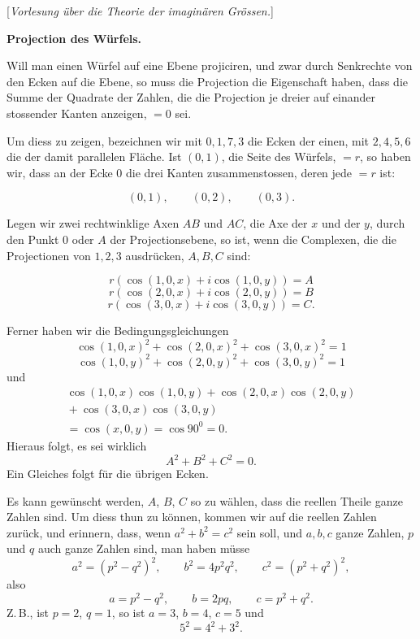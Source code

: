 \clearpage{}

\begin{center}[\emph{Vorlesung über die Theorie der imaginären Grössen.}]\end{center}

\begin{center}\bfseries Projection des Würfels.\end{center}

Will man einen Würfel auf eine Ebene projiciren, und zwar durch Senkrechte von den Ecken auf die Ebene, so muss die Projection die Eigenschaft haben, dass die Summe der Quadrate der Zahlen, die die Projection je dreier auf einander stossender Kanten anzeigen, $=0$ sei.

Um diess zu zeigen, bezeichnen wir mit $0,1,7,3$ die Ecken der einen, mit $2,4,5,6$ die der damit parallelen Fläche. Ist $(0,1)$, die Seite des Würfels, $=r$, so haben wir, dass an der Ecke $0$ die drei Kanten zusammenstossen, deren jede $=r$ ist:

\begin{center}\end{center}

\[
(0,1),\qquad (0,2),\qquad (0,3).
\]

Legen wir zwei rechtwinklige Axen $AB$ und $AC$, die Axe der $x$ und der $y$, durch den Punkt $0$ oder $A$ der Projectionsebene, so ist, wenn die Complexen, die die Projectionen von $1,2,3$ ausdrücken, $A,B,C$ sind:

\begin{center}\begin{minipage}{5.2cm}\end{minipage}\hspace{.3cm}\begin{minipage}{7.2cm}

\[
r(\cos(1,0,x)+i\cos(1,0,y)) = A
\]
\[
r(\cos(2,0,x)+i\cos(2,0,y)) = B
\]
\[
r(\cos(3,0,x)+i\cos(3,0,y)) = C.
\]
\end{minipage}\end{center}
Ferner haben wir die Bedingungsgleichungen
\[
\cos(1,0,x)^2+\cos(2,0,x)^2+\cos(3,0,x)^2 = 1
\]
\[
\cos(1,0,y)^2+\cos(2,0,y)^2+\cos(3,0,y)^2 = 1
\]
und
\[
\begin{gathered}\cos(1,0,x)\cos(1,0,y)+\cos(2,0,x)\cos(2,0,y)\\{}+\cos(3,0,x)\cos(3,0,y)\\{}=\cos(x,0,y)=\cos 90^0=0.\end{gathered}
\]
Hieraus folgt, es sei wirklich
\[
A^2+B^2+C^2=0.
\]
Ein Gleiches folgt für die übrigen Ecken.

Es kann gewünscht werden, $A$, $B$, $C$ so zu wählen, dass die reellen Theile ganze Zahlen sind. Um diess thun zu können, kommen wir auf die reellen Zahlen zurück, und erinnern, dass, wenn $a^2+b^2=c^2$ sein soll, und $a,b,c$ ganze Zahlen, $p$ und $q$ auch ganze Zahlen sind, man haben müsse
\[
a^2=(p^2-q^2)^2,\qquad b^2=4p^2q^2,\qquad c^2=(p^2+q^2)^2,
\]
also
\[
a=p^2-q^2,\qquad b=2pq,\qquad c=p^2+q^2.
\]
Z.\,B., ist $p=2$, $q=1$, so ist $a=3$, $b=4$, $c=5$ und
\[
5^2=4^2+3^2.
\]
